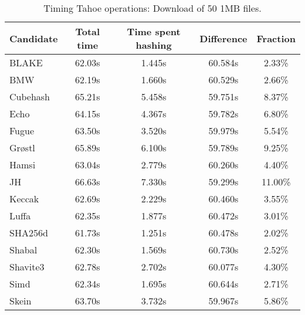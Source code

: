 \begin{table}[h]
  \centering
  \caption{Timing Tahoe operations: Download of 50 1MB files.}
  \begin{tabular}{ | l | c | c | c | c | }
    \hline
    Candidate & Total time & Time spent hashing & Difference & Fraction \\ \hline
    BLAKE     &  62.03s  &  1.445s  &  60.584s  &  2.33\%   \\  \hline
    BMW       &  62.19s  &  1.660s  &  60.529s  &  2.66\%   \\  \hline
    Cubehash  &  65.21s  &  5.458s  &  59.751s  &  8.37\%   \\  \hline
    Echo      &  64.15s  &  4.367s  &  59.782s  &  6.80\%   \\  \hline
    Fugue     &  63.50s  &  3.520s  &  59.979s  &  5.54\%   \\  \hline
    Grøstl    &  65.89s  &  6.100s  &  59.789s  &  9.25\%   \\  \hline
    Hamsi     &  63.04s  &  2.779s  &  60.260s  &  4.40\%   \\  \hline
    JH        &  66.63s  &  7.330s  &  59.299s  &  11.00\%  \\  \hline
    Keccak    &  62.69s  &  2.229s  &  60.460s  &  3.55\%   \\  \hline
    Luffa     &  62.35s  &  1.877s  &  60.472s  &  3.01\%   \\  \hline
    SHA256d   &  61.73s  &  1.251s  &  60.478s  &  2.02\%   \\  \hline
    Shabal    &  62.30s  &  1.569s  &  60.730s  &  2.52\%   \\  \hline
    Shavite3  &  62.78s  &  2.702s  &  60.077s  &  4.30\%   \\  \hline
    Simd      &  62.34s  &  1.695s  &  60.644s  &  2.71\%   \\  \hline
    Skein     &  63.70s  &  3.732s  &  59.967s  &  5.86\%   \\  \hline
  \end{tabular}
  \label{tbl:hashingtimes:get1mb}
\end{table}
